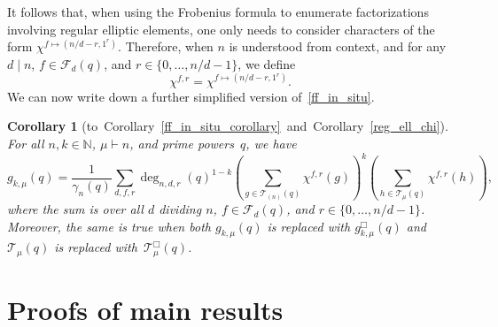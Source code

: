 \documentclass[10pt]{article}
\newtheorem{corollary}[theorem]{Corollary}
\theoremstyle{definition}
\newcommand{\CF}{\mathcal{F}}
\newcommand{\N}{\mathbb{N}}
\newcommand{\CT}{\mathcal{T}}
\begin{document}
It follows that, when using the Frobenius formula to enumerate factorizations involving regular elliptic elements, one only needs to consider characters of the form \(\chi^{f \mapsto (n/d-r,1^r)}\).
Therefore, when \(n\) is understood from context, and for any \(d \mid n\), \(f \in \CF_d (q)\), and \(r \in \{0,\ldots,n/d-1\}\), we define
\begin{equation}
\chi^{f,r} = \chi^{f \mapsto (n/d-r,1^r)}.
\end{equation}
We can now write down a further simplified version of~\eqref{ff_in_situ}.
\begin{corollary}[to~Corollary~\ref{ff_in_situ_corollary}~and~Corollary~\ref{reg_ell_chi}]
\label{simpler_ff_in_situ_corollary}
For all \(n,k \in \N\), \(\mu \vdash n\), and prime powers~\(q\), we have
\begin{equation}
\label{simpler_ff_in_situ}
g_{k,\mu} (q)
=
\frac{1}{\gamma_n(q)}
\sum_{d,f,r}
\deg_{n,d,r}(q)^{1-k}
\left ( \sum_{g \in \CT_{(n)} (q)} \chi^{f,r}(g) \right )^k
\left ( \sum_{h \in \CT_\mu (q)}   \chi^{f,r}(h) \right ),
\end{equation}
where the sum is over all \(d\) dividing \(n\), \(f \in \CF_d (q)\), and \(r \in \{0,\ldots,n/d-1\}\).
Moreover, the same is true when both \(g_{k,\mu} (q)\) is replaced with \(g_{k,\mu}^\Box (q)\) and \(\CT_\mu (q)\) is replaced with~\(\CT_\mu^\Box (q)\).
\end{corollary}















































\section{Proofs of main results}
\label{main_results_section}
\end{document}
